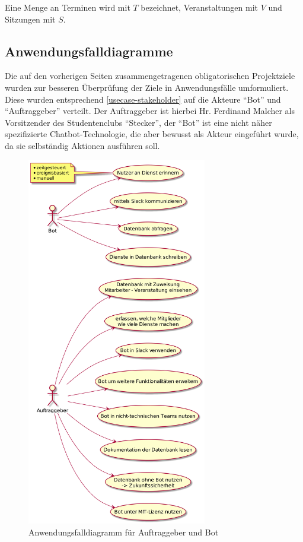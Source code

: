 Eine Menge an Terminen wird mit $T$ bezeichnet, Veranstaltungen mit $V$ und Sitzungen mit $S$.

\subsection{Anwendungsfalldiagramme}

Die auf den vorherigen Seiten zusammengetragenen obligatorischen Projektziele wurden zur besseren Überprüfung der Ziele in Anwendungsfälle umformuliert. Diese wurden entsprechend \autoref{usecase-stakeholder} auf die Akteure \enquote{Bot} und \enquote{Auftraggeber} verteilt.
Der Auftraggeber ist hierbei Hr. Ferdinand Malcher als Vorsitzender des Studentenclubs \enquote{Stecker}, der \enquote{Bot} ist eine nicht näher spezifizierte Chatbot-Technologie, die aber bewusst als Akteur eingeführt wurde, da sie selbständig Aktionen ausführen soll.

\begin{figure}[htbp]
    \includegraphics[width=0.7\textwidth]{../docs/uml/usecase-stakeholder.png}
     \caption{Anwendungsfalldiagramm für Auftraggeber und Bot}
     \label{usecase-auftrag}
\end{figure}

